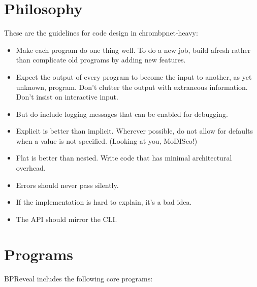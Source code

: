 \documentclass{article}
\begin{document}
\newpage

\section{Philosophy}

These are the guidelines for code design in chrombpnet-heavy:

\begin{itemize}
    \item Make each program do one thing well. To do a new job, build afresh rather than complicate old programs by adding new features.
    \item Expect the output of every program to become the input to another, as yet unknown, program. Don't clutter the output with extraneous information. Don't insist on interactive input. 
    \item But do include logging messages that can be enabled for debugging. 
    \item Explicit is better than implicit. Wherever possible, do not allow for defaults when a value is not specified.  (Looking at you, MoDISco!)
    \item Flat is better than nested. Write code that has minimal architectural overhead. 
    \item Errors should never pass silently.
    \item If the implementation is hard to explain, it's a bad idea.
    \item The API should mirror the CLI. 
\end{itemize}

\newpage

\section{Programs}

BPReveal includes the following core programs:
\end{document}
